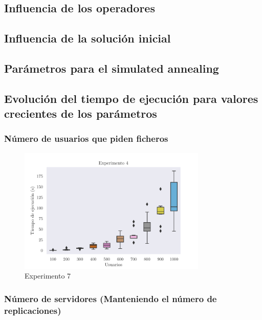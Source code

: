 \subsection{Influencia de los operadores}

\subsection{Influencia de la solución inicial}

\subsection{Parámetros para el simulated annealing}

\subsection{Evolución del tiempo de ejecución para valores crecientes de los parámetros}

\subsubsection{Número de usuarios que piden ficheros}



\begin{figure}[H]
\centering
\includegraphics[width=0.8\textwidth]{include/plots/ex4_u_time_bplot.pdf}
\caption{Experimento 7}%
\label{fig:ex7time}
\end{figure}

\subsubsection{Número de servidores (Manteniendo el número de replicaciones)}

